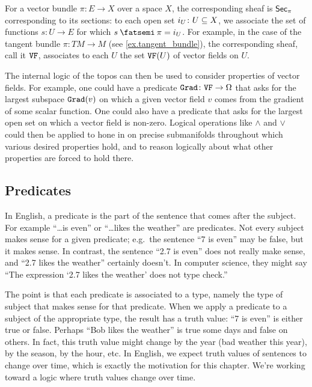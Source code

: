 \documentclass[7Sketches]{subfiles}
\begin{document}
\begin{example}
For a vector bundle $\pi\colon E\to X$ over a space $X$, the corresponding sheaf is $\Fun{Sec}_\pi$ corresponding to its sections: to each open set $i_U\colon U\ss X$, we associate the set of functions $s\colon U\to E$ for which $s\cp\pi=i_U$. For example, in the case of the tangent bundle $\pi\colon TM\to M$ (see \cref{ex.tangent_bundle}), the corresponding sheaf, call it $\const{VF}$, associates to each $U$ the set $\const{VF}(U)$ of vector fields on $U$.

The internal logic of the topos can then be used to consider properties of vector fields. For example, one could have a predicate $\const{Grad}\colon\const{VF}\to\Omega$ that asks for the largest subspace $\const{Grad}(v)$ on which a given vector field $v$ comes from the gradient of some scalar function. One could also have a predicate that asks for the largest open set on which a vector field is non-zero. Logical operations like $\wedge$ and $\vee$ could then be applied to hone in on precise submanifolds throughout which various desired properties hold, and to reason logically about what other properties are forced to hold there.
\end{example}

\subsection{Predicates}%
\label{subsec.predicates}
%
In English, a predicate is the part of the sentence that comes after the subject. For example ``\dots is even'' or ``\dots likes the weather'' are predicates. Not every subject makes sense for a given predicate; e.g.\ the sentence ``7 is even'' may be false, but it makes sense. In contrast, the sentence ``2.7 is even'' does not really make sense, and ``2.7 likes the weather'' certainly doesn't. In computer science, they might say ``The expression `2.7 likes the weather' does not type check.'' 

The point is that each predicate is associated to a type, namely the type of subject that makes sense for that predicate. When we apply a predicate to a subject of the appropriate type, the result has a truth value: ``7 is even'' is either true or false. Perhaps ``Bob likes the weather'' is true some days and false on others. In fact, this truth value might change by the year (bad weather this year), by the season, by the hour, etc. In English, we expect truth values of sentences to change over time, which is exactly the motivation for this chapter. We're working toward a logic where truth values change over time.
\end{document}
